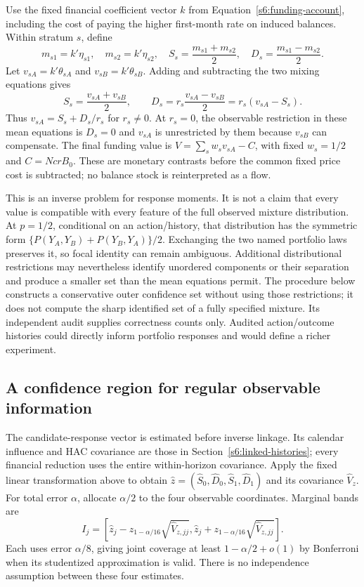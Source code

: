 Use the fixed financial coefficient vector $k$ from
Equation~\eqref{s6:funding-account}, including the cost of paying the higher
first-month rate on induced balances. Within stratum $s$, define
\[
 m_{s1}=k'\eta_{s1},\quad m_{s2}=k'\eta_{s2},\quad
 S_s=\frac{m_{s1}+m_{s2}}2,\quad D_s=\frac{m_{s1}-m_{s2}}2.
\]
Let $v_{sA}=k'\theta_{sA}$ and $v_{sB}=k'\theta_{sB}$. Adding and
subtracting the two mixing equations gives
\begin{equation}
 S_s=\frac{v_{sA}+v_{sB}}2,\qquad
 D_s=r_s\frac{v_{sA}-v_{sB}}2=r_s(v_{sA}-S_s).
 \label{s61:diagonal-map}
\end{equation}
Thus $v_{sA}=S_s+D_s/r_s$ for $r_s\ne0$. At $r_s=0$, the observable
restriction in these mean equations is $D_s=0$ and $v_{sA}$ is unrestricted
by them because $v_{sB}$ can compensate. The final funding value is
$V=\sum_s w_s v_{sA}-C$, with fixed $w_s=1/2$ and
$C=Nc r B_0$. These are monetary contrasts before the common fixed price
cost is subtracted; no balance stock is reinterpreted as a flow.

This is an inverse problem for response moments. It is not a claim that
every value is compatible with every feature of the full observed mixture
distribution. At $p=1/2$, conditional on an action/history, that distribution
has the symmetric form
$\{P(Y_A,Y_B)+P(Y_B,Y_A)\}/2$. Exchanging the two named portfolio laws
preserves it, so focal identity can remain ambiguous. Additional distributional
restrictions may nevertheless identify unordered components or their
separation and produce a smaller set than the mean equations permit.
The procedure below constructs a conservative outer confidence set without
using those restrictions; it does not compute the sharp identified set of
a fully specified mixture. Its independent audit supplies correctness counts
only. Audited action/outcome histories could directly inform portfolio
responses and would define a richer experiment.

\subsection{A confidence region for regular observable information}
The candidate-response vector is estimated before inverse linkage. Its
calendar influence and HAC covariance are those in
Section~\ref{s6:linked-histories}; every financial reduction uses the entire
within-horizon covariance. Apply the fixed linear transformation above to
obtain $\widehat z=(\widehat S_0,\widehat D_0,
\widehat S_1,\widehat D_1)$ and its covariance $\widehat V_z$.
For total error $\alpha$, allocate $\alpha/2$ to the four observable
coordinates. Marginal bands are
\begin{equation}
 I_j=\left[\widehat z_j-z_{1-\alpha/16}\sqrt{\widehat V_{z,jj}},
                 \widehat z_j+z_{1-\alpha/16}\sqrt{\widehat V_{z,jj}}\right].
 \label{s61:primitive-bands}
\end{equation}
Each uses error $\alpha/8$, giving joint coverage at least
$1-\alpha/2+o(1)$ by Bonferroni when its studentized approximation is valid.
There is no independence assumption between these four estimates.

